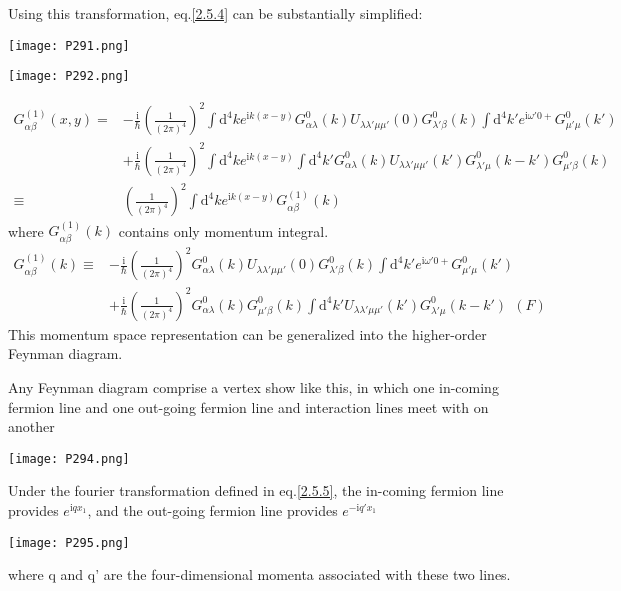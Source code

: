 Using this transformation, eq.\ref{2.5.4} can be substantially simplified:
\begin{center}
\texttt{[image: P291.png]}
\end{center}\begin{center}
\texttt{[image: P292.png]}
\end{center}
\begin{align}
G_{\alpha\beta}^{(1)}(x,y)=&-\frac{\mathrm{i}}{\hbar}(\frac{1}{(2\pi)^4})^2\int \mathrm{d}^4ke^{\mathrm{i}k(x-y)}G_{\alpha\lambda}^0(k)U_{\lambda\lambda'\mu\mu'}(0)G_{\lambda'\beta}^0(k)\int \mathrm{d}^4k'e^{\mathrm{i}\omega'0+}G_{\mu'\mu}^0(k')\nonumber \\
&+\frac{\mathrm{i}}{\hbar}(\frac{1}{(2\pi)^4})^2\int \mathrm{d}^4ke^{\mathrm{i}k(x-y)}\int \mathrm{d}^4k'G_{\alpha\lambda}^0(k)U_{\lambda\lambda'\mu\mu'}(k')G_{\lambda'\mu}^0(k-k')G_{\mu'\beta}^0(k)\nonumber \\
\equiv & (\frac{1}{(2\pi)^4})^2\int \mathrm{d}^4ke^{\mathrm{i}k(x-y)}G_{\alpha\beta}^{(1)}(k) \nonumber
\end{align}
where $G_{\alpha\beta}^{(1)}(k)$ contains only momentum integral.
\begin{align}\label{2.5.8}
G_{\alpha\beta}^{(1)}(k)\equiv &-\frac{\mathrm{i}}{\hbar}(\frac{1}{(2\pi)^4})^2G_{\alpha\lambda}^0(k)U_{\lambda\lambda'\mu\mu'}(0)G_{\lambda'\beta}^0(k)\int \mathrm{d}^4k'e^{\mathrm{i}\omega'0+}G_{\mu'\mu}^0(k') \nonumber \\
&+\frac{\mathrm{i}}{\hbar}(\frac{1}{(2\pi)^4})^2G_{\alpha\lambda}^0(k)G_{\mu'\beta}^0(k)\int \mathrm{d}^4k'U_{\lambda\lambda'\mu\mu'}(k')G_{\lambda'\mu}^0(k-k')\ \ (F)
\end{align}
This momentum space representation can be generalized into the higher-order Feynman diagram.

Any Feynman diagram comprise a vertex show like this, in which one in-coming fermion line and one out-going fermion line and interaction lines meet with on another
\begin{center}
\texttt{[image: P294.png]}
\end{center}
Under the fourier transformation defined in eq.\ref{2.5.5}, the in-coming fermion line provides $e^{\mathrm{i}qx_1}$, and the out-going fermion line provides $e^{-\mathrm{i}q'x_1}$
\begin{center}
\texttt{[image: P295.png]}
\end{center}

where q and q' are the four-dimensional momenta associated with these two lines.


